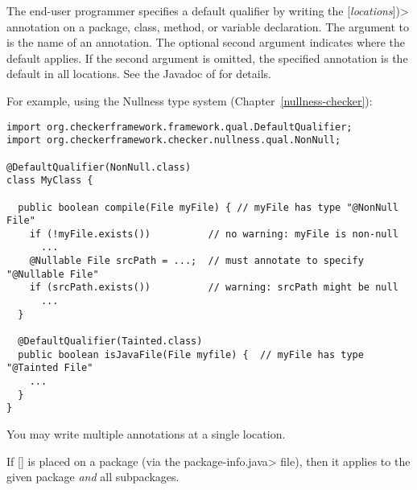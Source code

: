 The end-user programmer specifies a default qualifier by writing the
[\emph{locations}]\<)>
annotation on a package, class, method, or variable declaration.  The
argument to  is the 
name of an annotation.
The optional second argument indicates where the default
applies.  If the second argument is omitted, the specified annotation is
the default in all locations.  See the Javadoc of  for details.

For example, using the Nullness type system (Chapter~\ref{nullness-checker}):

\begin{Verbatim}
import org.checkerframework.framework.qual.DefaultQualifier;
import org.checkerframework.checker.nullness.qual.NonNull;

@DefaultQualifier(NonNull.class)
class MyClass {

  public boolean compile(File myFile) { // myFile has type "@NonNull File"
    if (!myFile.exists())          // no warning: myFile is non-null
      ...
    @Nullable File srcPath = ...;  // must annotate to specify "@Nullable File"
    if (srcPath.exists())          // warning: srcPath might be null
      ...
  }

  @DefaultQualifier(Tainted.class)
  public boolean isJavaFile(File myfile) {  // myFile has type "@Tainted File"
    ...
  }
}
\end{Verbatim}

You may write multiple
 annotations at a single location.

If [] is placed on a package (via the
\<package-info.java> file), then it applies to the given package \emph{and}
all subpackages.






